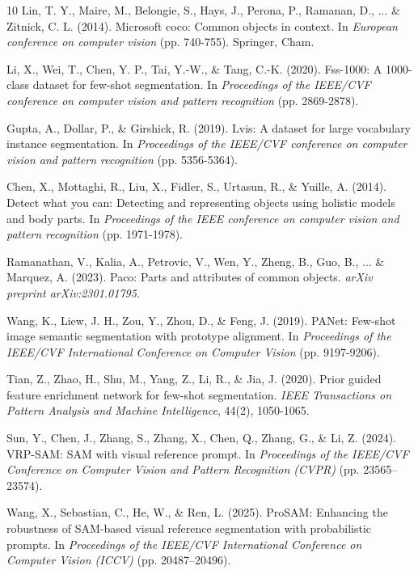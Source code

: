 \documentclass[journal,12pt,onecolumn,draftclsnofoot]{IEEEtran}
\begin{document}
\begin{thebibliography}{10}
Lin, T. Y., Maire, M., Belongie, S., Hays, J., Perona, P., Ramanan, D., ... \& Zitnick, C. L. (2014). Microsoft coco: Common objects in context. In \textit{European conference on computer vision} (pp. 740-755). Springer, Cham.

Li, X., Wei, T., Chen, Y. P., Tai, Y.-W., \& Tang, C.-K. (2020). Fss-1000: A 1000-class dataset for few-shot segmentation. In \textit{Proceedings of the IEEE/CVF conference on computer vision and pattern recognition} (pp. 2869-2878).

Gupta, A., Dollar, P., \& Girshick, R. (2019). Lvis: A dataset for large vocabulary instance segmentation. In \textit{Proceedings of the IEEE/CVF conference on computer vision and pattern recognition} (pp. 5356-5364).

Chen, X., Mottaghi, R., Liu, X., Fidler, S., Urtasun, R., \& Yuille, A. (2014). Detect what you can: Detecting and representing objects using holistic models and body parts. In \textit{Proceedings of the IEEE conference on computer vision and pattern recognition} (pp. 1971-1978).

Ramanathan, V., Kalia, A., Petrovic, V., Wen, Y., Zheng, B., Guo, B., ... \& Marquez, A. (2023). Paco: Parts and attributes of common objects. \textit{arXiv preprint arXiv:2301.01795}.

Wang, K., Liew, J. H., Zou, Y., Zhou, D., \& Feng, J. (2019). PANet: Few-shot image semantic segmentation with prototype alignment. In \textit{Proceedings of the IEEE/CVF International Conference on Computer Vision} (pp. 9197-9206).

Tian, Z., Zhao, H., Shu, M., Yang, Z., Li, R., \& Jia, J. (2020). Prior guided feature enrichment network for few-shot segmentation. \textit{IEEE Transactions on Pattern Analysis and Machine Intelligence}, 44(2), 1050-1065.

Sun, Y., Chen, J., Zhang, S., Zhang, X., Chen, Q., Zhang, G., \& Li, Z. (2024).
VRP-SAM: SAM with visual reference prompt.
In \textit{Proceedings of the IEEE/CVF Conference on Computer Vision and Pattern Recognition (CVPR)} (pp. 23565--23574).

Wang, X., Sebastian, C., He, W., \& Ren, L. (2025).
ProSAM: Enhancing the robustness of SAM-based visual reference segmentation with probabilistic prompts.
In \textit{Proceedings of the IEEE/CVF International Conference on Computer Vision (ICCV)} (pp. 20487--20496).


\end{thebibliography}
\end{document}
